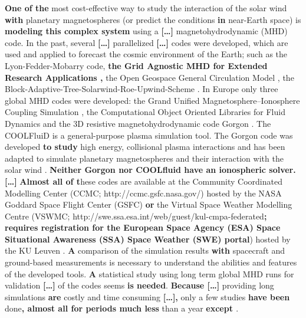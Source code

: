 \documentclass[linenumbers,draft]{agujournal}
\begin{document}
\textbf{One of the} most cost-effective way to study the interaction of the solar wind \textbf{with} planetary magnetospheres (or predict the conditions \textbf{in} near-Earth space) is \textbf{modeling this complex system} using a \textbf{[\dots]} magnetohydrodynamic (MHD) code. In the past, several \textbf{[\dots]} parallelized \textbf{[\dots]} codes were developed, which are used and applied to forecast the cosmic environment of the Earth; such as the Lyon-Fedder-Mobarry \citep[LFM;][]{lyon04:_lyon_fedder_mobar_lfm_mhd} code, \textbf{the Grid Agnostic MHD for Extended Research Applications \citep[GAMERA;][]{zhang19:_gamer},} the Open Geospace General Circulation Model \citep[OpenGGCM;][]{raeder08:_openg_simul_themis_mission}, the Block-Adaptive-Tree-Solarwind-Roe-Upwind-Scheme \citep[BATS-R-US;][]{powell99:_solut_adapt_upwin_schem_ideal_magnet,toth12:_adapt}. In Europe only three global MHD codes were developed: the Grand Unified Magnetosphere--Ionosphere Coupling Simulation \citep[GUMICS$-$4;][]{janhunen12:_gumic_mhd}, the Computational Object Oriented Libraries for Fluid Dynamics \citep[COOLFluiD;][]{lani12:_coolf_open_comput_platf_aerot} and the 3D resistive magnetohydrodynamic code Gorgon \citep{chittenden04:_x_z,ciardi07}. The COOLFluiD is a general-purpose plasma simulation tool. The Gorgon code was developed \textbf{to study} high energy, collisional plasma interactions and has been adapted to simulate planetary magnetospheres and their interaction with the solar wind \citep{mejnertsen16:_global_mhd_neptun,mejnertsen18:_global_mhd_simul_earth_bow}. \textbf{Neither Gorgon nor COOLfluid have an ionospheric solver.} \textbf{[\dots]} \textbf{Almost all of t}hese codes are available at the Community Coordinated Modelling Center (CCMC; http://ccmc.gsfc.nasa.gov/) hosted by the NASA Goddard Space Flight Center (GSFC) \textbf{or} the Virtual Space Weather Modelling Centre (VSWMC; http://swe.ssa.esa.int/web/guest/kul-cmpa-federated\textbf{; requires registration for the European Space Agency (ESA) Space Situational Awareness (SSA) Space Weather (SWE) portal}) hosted by the KU Leuven \citep{poedts20:_virtual_space_weath_model_centr}. \textbf{A} comparison of the simulation results \textbf{with} spacecraft and ground-based measurements is necessary to understand the abilities and features of the developed tools. \textbf{A} statistical study using long term global MHD runs for validation \textbf{[\dots]} of the codes seems \textbf{is needed}. \textbf{Because [\dots]} providing long simulations \textbf{are} costly and time consuming \textbf{[\dots],} only a few studies \textbf{have been} done\textbf{, almost all for periods much less} than a year \textbf{except \citet{liemohn18:_real_time_swmf_ccmc}}. 
\end{document}
